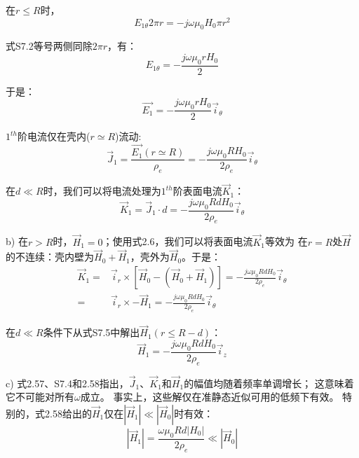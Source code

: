 在$r\le R$时，
\begin{equation*}
E_{1\theta} 2\pi r = -j\omega \mu_0 H_0 \pi r^2 \tag{S7.2}
\end{equation*}

式S7.2等号两侧同除$2\pi r$，有：
\begin{equation*}
E_{1\theta} = -\frac{j\omega \mu_0 r H_0}{2} \tag{S7.3}
\end{equation*}

于是：
\begin{equation*}
\vec{E_{1}} = -\frac{j\omega \mu_0 r H_0}{2}\vec{i}_\theta \tag{2.56}
\end{equation*}

$1^{th}$阶电流仅在壳内($r\simeq R$)流动:
\begin{equation*}
\vec{J}_1=\frac{\vec{E_{1}}(r\simeq R)}{\rho_e} = -\frac{j\omega \mu_0 R H_0}{2\rho_e}\vec{i}_\theta \tag{2.57}
\end{equation*}

在$d\ll R$时，我们可以将电流处理为$1^{th}$阶表面电流$\vec{K}_1$：
\begin{equation*}
\vec{K}_1=\vec{J}_1 \cdot d= -\frac{j\omega \mu_0 R d H_0}{2\rho_e}\vec{i}_\theta \tag{S7.4}
\end{equation*}

b) 在$r>R$时，$\vec{H}_1=0$；使用式2.6，我们可以将表面电流$\vec{K}_1$等效为
在$r=R$处$\vec{H}$的不连续：壳内壁为$\vec{H}_0+\vec{H}_1$，壳外为$\vec{H}_0$。于是：
\begin{align}
\vec{K}_1=&\vec{i}_r \times [\vec{H}_0-(\vec{H}_0+\vec{H}_1)]=-\frac{j\omega \mu_0 R d H_0}{2\rho_e}\vec{i}_\theta\nonumber\\
=&\vec{i}_r\times-\vec{H}_1=-\frac{j\omega \mu_0 R d H_0}{2\rho_e}\vec{i}_\theta\nonumber\tag{S7.5}
\end{align}

在$d\ll R$条件下从式S7.5中解出$\vec{H}_1(r\le R-d)$：
\begin{equation*}
\vec{H}_1=-\frac{j\omega \mu_0 R d H_0}{2\rho_e}\vec{i}_z \tag{2.58}
\end{equation*}

c) 式2.57、S7.4和2.58指出，$\vec{J}_1$、$\vec{K}_1$和$\vec{H}_1$的幅值均随着频率单调增长；
这意味着它不可能对所有$\omega$成立。
事实上，这些解仅在准静态近似可用的低频下有效。
特别的，式2.58给出的$\vec{H}_1$仅在$|\vec{H}_1|\ll |\vec{H}_0|$时有效：
\begin{equation*}
|\vec{H}_1|=\frac{\omega \mu_0 R d |H_0|}{2\rho_e}\ll |\vec{H}_0|\tag{S7.6}
\end{equation*}


